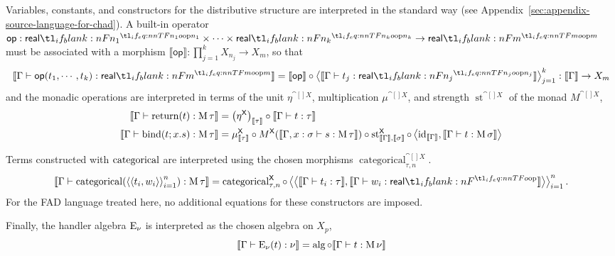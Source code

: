 \documentclass[11pt,a4paper]{article}
\theoremstyle{definition}
\theoremstyle{remark}
\providecommand{\id}{\mathrm{id}}
\providecommand{\srcop}{\mathsf{op}}
\providecommand{\genint}[1]{\llbracket #1\rrbracket}
\providecommand{\categ}{\operatorname{categorical}}
\providecommand{\str}{\operatorname{st}}
\begin{document}
Variables, constants, and constructors for the distributive structure are interpreted in the standard way (see Appendix~\ref{sec:appendix-source-language-for-chad}). A built-in operator \( \srcop: \srcreal[n_{1}] \times \cdots \times \srcreal[n_{k}] \to \srcreal[m] \) must be associated with a morphism \( \genint{\srcop}: \prod_{j = 1}^{k} X_{n_{j}} \to X_{m} \), so that
\begin{equation}
  \label{eq:source-language-built-in-operator-interpretation}
  \genint{\Gamma \vdash \fn[n]{ \srcop }{ t_{1}, \cdots, t_{k} } : \srcreal[m]}
  = \genint{\srcop}
  \circ
  \tupling{\genint{\Gamma \vdash t_{j} : \srcreal[n_{j}]}}_{j = 1}^{k}:
  \genint{\Gamma}
  \to
  X_{m}
\end{equation}
and the monadic operations are interpreted in terms of the unit \( \eta^{\cat[]{X}} \), multiplication \( \mu^{\cat[]{X}} \), and strength \( \str^{\cat[]{X}} \) of the monad \( M^{\cat[]{X}} \),
\begin{equation*}
  \begin{aligned}
    \genint{\Gamma \vdash \fn[n]{ \opn[b]{return} }{ t } : \opn[b]{M} \tau}
    &=
      \Nat[nn]{ \eta^{\cat[]{X}} }{ \genint{\tau} }
      \circ
      \genint{\Gamma \vdash t : \tau}
    \\
    \genint{\Gamma \vdash \fn[n]{ \opn[b]{bind} }{ t; x . s } : \opn[b]{M} \tau}
    &=
      \mu^{\cat[]{X}}_{\genint{\tau}}%
      \circ
      \Fun[nn]{ M^{\cat[]{X}} }{
      \genint{\Gamma, x : \sigma \vdash s : \opn[b]{M} \tau}
      }
      \circ
      \str^{\cat[]{X}}_{ \genint{\Gamma}, \genint{\sigma} }%
      \circ
      \tupling{
      \id_{\genint{\Gamma}},
      \genint{\Gamma \vdash t : \opn[b]{M} \sigma}
      }
  \end{aligned}
\end{equation*}

Terms constructed with \( \opn[b]{categorical} \) are interpreted using the chosen morphisms \( \categ_{\tau,n}^{\cat[]{X}} \).
\begin{equation*}
  \genint{
    \Gamma \vdash
    \fn[n]{ \opn[b]{categorical} }{
      \tuple{ \tuple{t_{i}, w_{i}} }_{i = 1}^{n}
    } :
    \opn[b]{M} \tau
  }
  =
  \categ_{\tau,n}^{\cat[]{X}}
  \circ
  \tupling{
    \tupling{
      \genint{\Gamma \vdash t_{i} : \tau},
      \genint{\Gamma \vdash w_{i} : \srcreal}
    }
  }_{i = 1}^{n}.
\end{equation*}
For the FAD language treated here, no additional equations for these constructors are imposed.

Finally, the handler algebra \( \opn[b]{E}_{\nu} \) is interpreted as the chosen algebra on \( X_{p} \),
\begin{equation}
  \label{eq:source-language-handler-algebra-interpretation}
  \genint{\Gamma \vdash \fn[n]{ \opn[b]{E}_{\nu} }{ t } : \nu}
  = \opn{alg} \circ \genint{\Gamma \vdash t : \opn[b]{M} \nu}
\end{equation}
\end{document}
